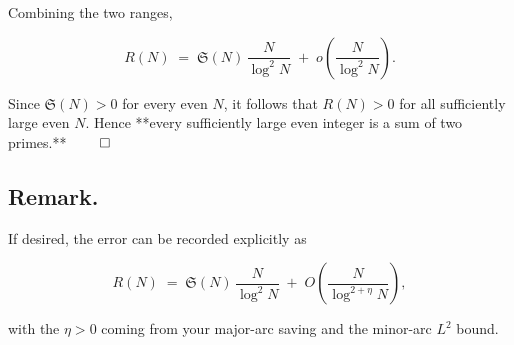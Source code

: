 \documentclass[11pt]{article}
\theoremstyle{definition}
\theoremstyle{remark}
\begin{document}
Combining the two ranges,

$$
R(N)
\;=\;\mathfrak S(N)\,\frac{N}{\log^2 N}\;+\;o\!\left(\frac{N}{\log^2 N}\right).
$$

Since $\mathfrak S(N)>0$ for every even $N$, it follows that $R(N)>0$ for all sufficiently large even $N$. Hence **every sufficiently large even integer is a sum of two primes.** $\qed$

\subsection*{Remark.} 
If desired, the error can be recorded explicitly as

$$
R(N)\;=\;\mathfrak S(N)\,\frac{N}{\log^2 N}\;+\;O\!\left(\frac{N}{\log^{2+\eta}N}\right),
$$

with the $\eta>0$ coming from your major-arc saving and the minor-arc $L^2$ bound.
\end{document}
